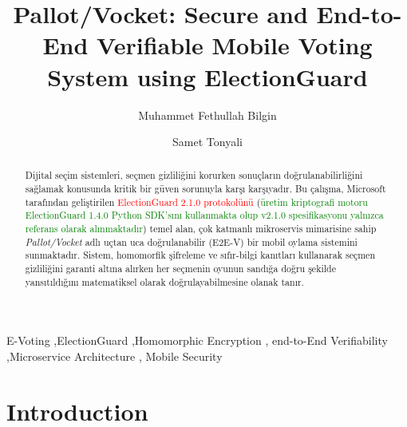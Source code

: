 \documentclass[a4paper,fleqn]{cas-sc}
\begin{document}
\title{Pallot/Vocket: Secure and End-to-End Verifiable Mobile Voting System using ElectionGuard}

\author[1]{Muhammet Fethullah Bilgin}

\author[1]{Samet Tonyali}

\address[1]{Gümüşhane University,
  Faculty of Engineering and Natural Sciences,
  Department of Software Engineering,
  Gümüşhane 29001, Türkiye}



\begin{abstract}
Dijital seçim sistemleri, seçmen gizliliğini korurken
sonuçların doğrulanabilirliğini sağlamak konusunda
kritik bir güven sorunuyla karşı karşıyadır.
Bu çalışma, Microsoft tarafından geliştirilen
\textcolor{red}{ElectionGuard 2.1.0 protokolünü}
(\textcolor{green}{üretim kriptografi motoru ElectionGuard 1.4.0 Python SDK'sını kullanmakta olup v2.1.0 spesifikasyonu yalnızca referans olarak alınmaktadır})
temel alan, çok katmanlı
mikroservis mimarisine sahip \emph{Pallot/Vocket} adlı uçtan
uca doğrulanabilir (E2E-V) bir mobil oylama sistemini sunmaktadır.
Sistem, homomorfik şifreleme ve sıfır-bilgi kanıtları
kullanarak seçmen gizliliğini garanti altına alırken
her seçmenin oyunun sandığa doğru şekilde
yansıtıldığını matematiksel olarak
doğrulayabilmesine olanak tanır.
\end{abstract}

\begin{keywords}
E-Voting \sep ElectionGuard \sep Homomorphic Encryption \sep
end-to-End Verifiability \sep Microservice Architecture \sep
Mobile Security
\end{keywords}

\maketitle

\section{Introduction}
\label{sec:introduction}
\end{document}

